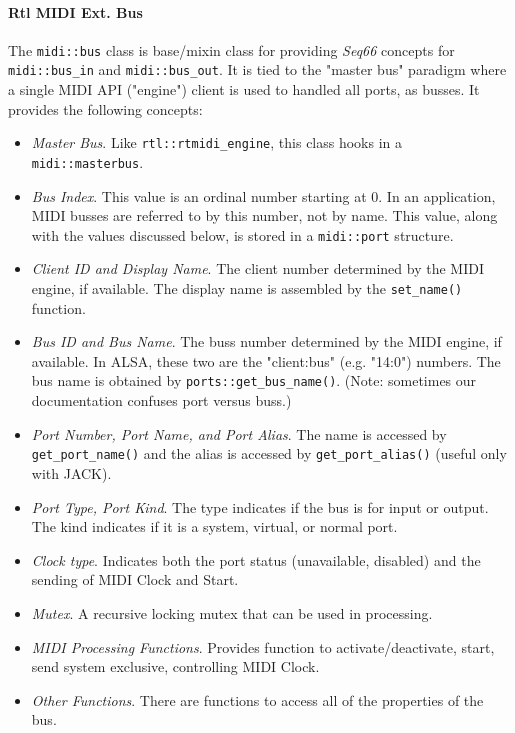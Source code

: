 \paragraph{Rtl MIDI Ext. Bus}
\label{paragraph:rtl_midi_extensions_bus}

   The \texttt{midi::bus} class is base/mixin class for providing
   \textsl{Seq66} concepts for \texttt{midi::bus\_in} and
   \texttt{midi::bus\_out}.
   It is tied to the "master bus" paradigm where a single MIDI
   API ("engine") client is used to handled all ports, as busses.
   It provides the following concepts:

   \begin{itemize}
      \item \textsl{Master Bus}.
         Like \texttt{rtl::rtmidi\_engine}, this class hooks in a
         \texttt{midi::masterbus}.
      \item \textsl{Bus Index}.
         This value is an ordinal number starting at 0.
         In an application, MIDI busses are referred to by this number, not
         by name.
         This value, along with the values discussed below, is stored
         in a \texttt{midi::port} structure.
      \item \textsl{Client ID and Display Name}.
         The client number determined by the MIDI engine, if available.
         The display name is assembled by the \texttt{set\_name()} function.
      \item \textsl{Bus ID and Bus Name}.
         The buss number determined by the MIDI engine, if available.
         In ALSA, these two are the "client:bus" (e.g. "14:0") numbers.
         The bus name is obtained by \texttt{ports::get\_bus\_name()}.
         (Note: sometimes our documentation confuses port versus buss.)
      \item \textsl{Port Number, Port Name, and Port Alias}.
         The name is accessed by \texttt{get\_port\_name()} and the
         alias is accessed by \texttt{get\_port\_alias()} (useful
         only with JACK).
      \item \textsl{Port Type, Port Kind}.
         The type indicates if the bus is for input or output.
         The kind indicates if it is a system, virtual, or normal port.
      \item \textsl{Clock type}.
         Indicates both the port status (unavailable, disabled) and the
         sending of MIDI Clock and Start.
      \item \textsl{Mutex}.
         A recursive locking mutex that can be used in processing.
      \item \textsl{MIDI Processing Functions}.
         Provides function to activate/deactivate, start, send system exclusive,
         controlling MIDI Clock.
      \item \textsl{Other Functions}.
         There are functions to access all of the properties of the
         bus.
   \end{itemize}

